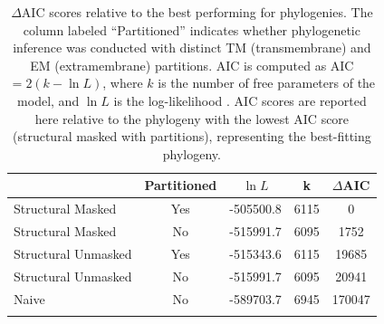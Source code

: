 \documentclass[fleqn,10pt]{wlpeerj}
\begin{document}
\vspace*{3cm}

\begin{table}[htbp]
	\centering
	\begin{tabular}{l c l l c}
		\hline\noalign{\smallskip}
		\multicolumn{1}{c}{MSA} & \multicolumn{1}{c}{Partitioned} & \multicolumn{1}{c}{$\ln L$} & \multicolumn{1}{c}{k} & \multicolumn{1}{l}{$\Delta$AIC} \\
		\hline\noalign{\smallskip}
		Structural Masked & Yes & -505500.8 & 6115 & 0 \\
		Structural Masked & No & -515991.7 & 6095 & 1752 \\  
		Structural Unmasked & Yes & -515343.6 & 6115 & 19685 \\
		Structural Unmasked & No & -515991.7 & 6095 & 20941 \\ 
		Naive & No &  -589703.7 & 6945 & 170047 \\
		\noalign{\smallskip}\hline\noalign{\smallskip} 
	\end{tabular}
	\caption{\label{tab:phylo_AIC} $\Delta$AIC scores relative to the best performing for phylogenies. The column labeled ``Partitioned'' indicates whether phylogenetic inference was conducted with distinct TM (transmembrane) and EM (extramembrane) partitions. AIC is computed as AIC $= 2(k - \ln L)$, where $k$ is the number of free parameters of the model, and $\ln L$ is the log-likelihood \citep{Akaike1974,BurnhamAnderson2004}. AIC scores are reported here relative to the phylogeny with the lowest AIC score (structural masked with partitions), representing the best-fitting phylogeny.}
\end{table}


\newpage
\end{document}
